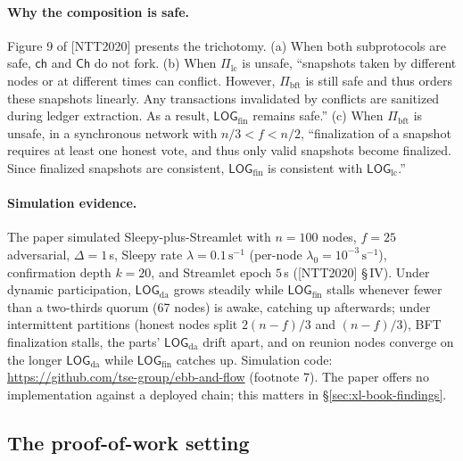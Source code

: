 \documentclass[11pt,a4paper]{article}
\theoremstyle{definition}
\begin{document}
\paragraph{Why the composition is safe.} Figure 9 of [NTT2020] presents
the trichotomy. (a) When both subprotocols are safe, $\mathsf{ch}$ and
$\mathsf{Ch}$ do not fork. (b) When $\Pi_{\mathrm{lc}}$ is unsafe,
``snapshots taken by different nodes or at different times can conflict.
However, $\Pi_{\mathrm{bft}}$ is still safe and thus orders these
snapshots linearly. Any transactions invalidated by conflicts are
sanitized during ledger extraction. As a result,
$\mathsf{LOG}_{\mathrm{fin}}$ remains safe.'' (c) When
$\Pi_{\mathrm{bft}}$ is unsafe, in a synchronous network with
$n/3 < f < n/2$, ``finalization of a snapshot requires at least one honest
vote, and thus only valid snapshots become finalized. Since finalized
snapshots are consistent, $\mathsf{LOG}_{\mathrm{fin}}$ is consistent with
$\mathsf{LOG}_{\mathrm{lc}}$.''

\paragraph{Simulation evidence.} The paper simulated Sleepy-plus-Streamlet
with $n = 100$ nodes, $f = 25$ adversarial, $\Delta = 1\,$s, Sleepy rate
$\lambda = 0.1\,\mathrm{s}^{-1}$ (per-node $\lambda_0 =
10^{-3}\,\mathrm{s}^{-1}$), confirmation depth $k = 20$, and Streamlet
epoch $5\,$s ([NTT2020] \S\,IV). Under dynamic participation,
$\mathsf{LOG}_{\mathrm{da}}$ grows steadily while
$\mathsf{LOG}_{\mathrm{fin}}$ stalls whenever fewer than a two-thirds
quorum (67 nodes) is awake, catching up afterwards; under intermittent
partitions (honest nodes split $2(n-f)/3$ and $(n-f)/3$), BFT finalization
stalls, the parts' $\mathsf{LOG}_{\mathrm{da}}$ drift apart, and on
reunion nodes converge on the longer $\mathsf{LOG}_{\mathrm{da}}$ while
$\mathsf{LOG}_{\mathrm{fin}}$ catches up. Simulation code:
\url{https://github.com/tse-group/ebb-and-flow} (footnote 7). The paper
offers no implementation against a deployed chain; this matters in
\S\ref{sec:xl-book-findings}.

\subsection{The proof-of-work setting}\label{sec:xl-pow-setting}
\end{document}
